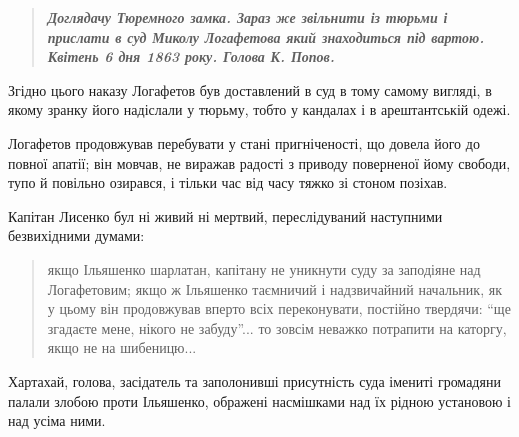 \documentclass[a4paper,20pt]{report}
\begin{document}
\begin{quote}
\em\bfseries
Доглядачу Тюремного замка. Зараз же звільнити із тюрьми і прислати в суд Миколу
Логафетова який знаходиться під вартою. Квітень 6 дня 1863 року. Голова
К. Попов.
\end{quote}

Згідно цього наказу Логафетов був доставлений в суд в тому самому вигляді,
в якому зранку його надіслали у тюрьму, тобто у кандалах і в арештантській одежі.

Логафетов продовжував перебувати у стані пригніченості, що довела його до повної апатії;
він мовчав, не виражав радості з приводу поверненої йому свободи, тупо й повільно озирався, і тільки
час від часу тяжко зі стоном позіхав.



Капітан Лисенко бул ні живий ні мертвий, переслідуваний наступними безвихідними думами: 

\begin{quote}
\em\bfseries

якщо Ільяшенко шарлатан, капітану не уникнути суду за заподіяне над
Логафетовим; якщо ж Ільяшенко таємничий і надзвичайний начальник, як у цьому
він продовжував вперто всіх переконувати, постійно твердячи: ``ще згадаєте мене,
нікого не забуду''... то зовсім неважко потрапити на каторгу, якщо не на
шибеницю...
    

\end{quote}

Хартахай, голова, засідатель та заполонивші присутність суда імениті громадяни
палали злобою проти Ільяшенко, ображені насмішками над їх рідною установою і
над усіма ними.
\end{document}
